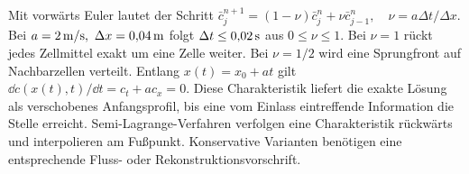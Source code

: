 Mit vorwärts Euler lautet der Schritt \(\bar c_j^{n+1}=(1-\nu)\bar c_j^n+\nu\bar c_{j-1}^n,\quad\nu=a\Delta t/\Delta x\). Bei \(a=2\,\mathrm{m/s},\ \Delta x=0{,}04\,\mathrm{m}\) folgt \(\Delta t\le0{,}02\,\mathrm{s}\) aus \(0\le\nu\le1\). Bei \(\nu=1\) rückt jedes Zellmittel exakt um eine Zelle weiter. Bei \(\nu=1/2\) wird eine Sprungfront auf Nachbarzellen verteilt.
Entlang \(x(t)=x_0+at\) gilt \(\dd c(x(t),t)/\dd t=c_t+ac_x=0\). Diese Charakteristik liefert die exakte Lösung als verschobenes Anfangsprofil, bis eine vom Einlass eintreffende Information die Stelle erreicht. Semi-Lagrange-Verfahren verfolgen eine Charakteristik rückwärts und interpolieren am Fußpunkt. Konservative Varianten benötigen eine entsprechende Fluss- oder Rekonstruktionsvorschrift.

